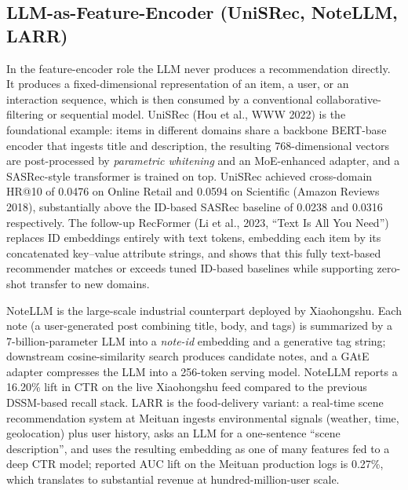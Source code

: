 \documentclass{article}
\begin{document}
\subsection{LLM-as-Feature-Encoder (UniSRec, NoteLLM, LARR)}\label{llm-as-feature-encoder-unisrec-notellm-larr}

In the feature-encoder role the LLM never produces a recommendation directly. It produces a fixed-dimensional representation of an item, a user, or an interaction sequence, which is then consumed by a conventional collaborative-filtering or sequential model. UniSRec (Hou et al., WWW 2022) is the foundational example: items in different domains share a backbone BERT-base encoder that ingests title and description, the resulting 768-dimensional vectors are post-processed by \emph{parametric whitening} and an MoE-enhanced adapter, and a SASRec-style transformer is trained on top. UniSRec achieved cross-domain HR@10 of 0.0476 on Online Retail and 0.0594 on Scientific (Amazon Reviews 2018), substantially above the ID-based SASRec baseline of 0.0238 and 0.0316 respectively. The follow-up RecFormer (Li et al., 2023, ``Text Is All You Need'') replaces ID embeddings entirely with text tokens, embedding each item by its concatenated key--value attribute strings, and shows that this fully text-based recommender matches or exceeds tuned ID-based baselines while supporting zero-shot transfer to new domains.

NoteLLM \citep{zhang2024textlikeencodingof} is the large-scale industrial counterpart deployed by Xiaohongshu. Each note (a user-generated post combining title, body, and tags) is summarized by a 7-billion-parameter LLM into a \emph{note-id} embedding and a generative tag string; downstream cosine-similarity search produces candidate notes, and a GAtE adapter compresses the LLM into a 256-token serving model. NoteLLM reports a 16.20\% lift in CTR on the live Xiaohongshu feed compared to the previous DSSM-based recall stack. LARR \citep{wan2024larrlargelanguagem} is the food-delivery variant: a real-time scene recommendation system at Meituan ingests environmental signals (weather, time, geolocation) plus user history, asks an LLM for a one-sentence ``scene description'', and uses the resulting embedding as one of many features fed to a deep CTR model; reported AUC lift on the Meituan production logs is 0.27\%, which translates to substantial revenue at hundred-million-user scale.
\end{document}
